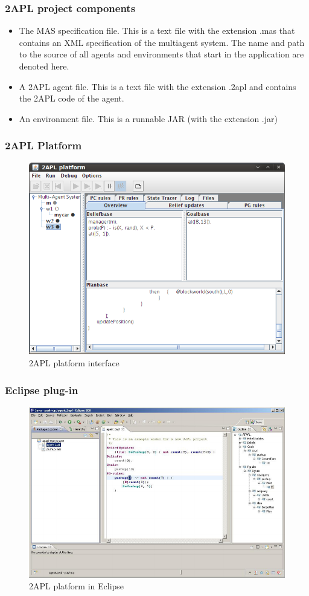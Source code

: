 	\begin{frame}
		\frametitle{2APL project components}
		\begin{itemize}
			\item  The MAS specification file. This is a text file with the extension .mas that contains an XML specification of the multiagent system. The name and path to the source of all agents and environments that start in the application are denoted here.
			\item A 2APL agent file. This is a text file with the extension .2apl and contains the 2APL code of the agent.
			\item An environment file. This is a runnable JAR (with the extension .jar)
		\end{itemize}
	\end{frame}
	
	
	\begin{frame}
		\frametitle{2APL Platform}
		
		\begin{figure}
			\includegraphics[width=0.75\linewidth]{images/2APLplatform.png}
			\caption{2APL platform interface}
		\end{figure}
		
	\end{frame}
	
	\begin{frame}
		\frametitle{Eclipse plug-in}
		\begin{figure}
			\includegraphics[width=0.85\linewidth]{images/2APLeclipse.png}
			\caption{2APL platform in Eclipse}
		\end{figure}
	\end{frame}
	
